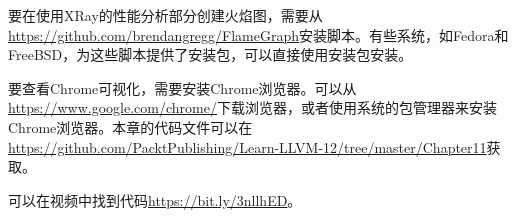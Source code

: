 要在使用XRay的性能分析部分创建火焰图，需要从\url{https://github.com/brendangregg/FlameGraph}安装脚本。有些系统，如Fedora和FreeBSD，为这些脚本提供了安装包，可以直接使用安装包安装。\par

要查看Chrome可视化，需要安装Chrome浏览器。可以从\url{https://www.google.com/chrome/}下载浏览器，或者使用系统的包管理器来安装Chrome浏览器。本章的代码文件可以在\url{https://github.com/PacktPublishing/Learn-LLVM-12/tree/master/Chapter11}获取。\par

可以在视频中找到代码\url{https://bit.ly/3nllhED}。\par